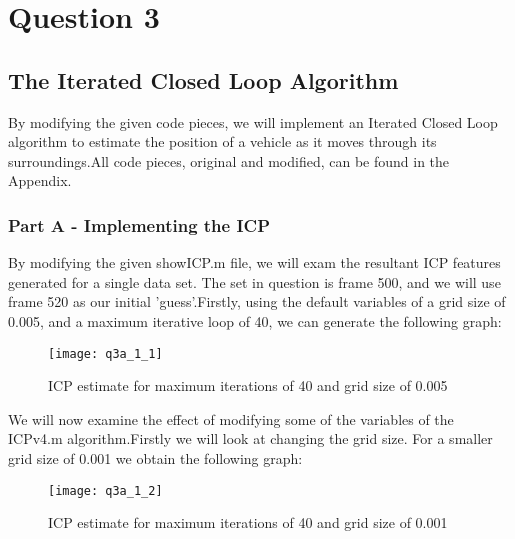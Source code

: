 \newpage
\section{Question 3}
	\subsection*{The Iterated Closed Loop Algorithm}
	\noindent
	\newline
	By modifying the given code pieces, we will implement an Iterated Closed Loop algorithm to estimate the position of a vehicle as it moves through its surroundings.\newline All code pieces, original and modified, can be found in the Appendix.
		\subsubsection{Part A - Implementing the ICP}
		\newline
		By modifying the given showICP.m file, we will exam the resultant ICP features generated for a single data set. The set in question is frame 500, and we will use frame 520 as our initial 'guess'.\newline Firstly, using the default variables of a grid size of 0.005, and a maximum iterative loop of 40, we can generate the following graph:\newline
			\begin{figure}[position = here]
				\begin{centering}
					\texttt{[image: q3a\_1\_1]}\\
					\caption[\textit{RPYAxes}]{ICP estimate for maximum iterations of 40 and grid size of 0.005}
				\end{centering}
			\end{figure}
		\newline
		We will now examine the effect of modifying some of the variables of the ICPv4.m algorithm.\newline Firstly we will look at changing the grid size. For a smaller grid size of 0.001 we obtain the following graph:\newline
		
			\begin{figure}[position = here]
				\begin{centering}
					\texttt{[image: q3a\_1\_2]}\\
					\caption[\textit{RPYAxes}]{ICP estimate for maximum iterations of 40 and grid size of 0.001}
				\end{centering}
			\end{figure}
			
